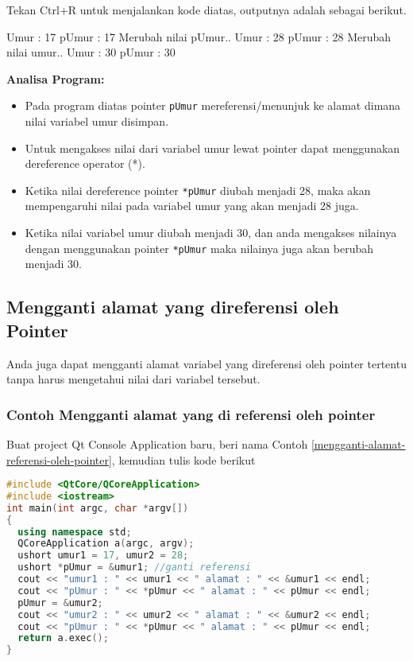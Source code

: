 Tekan Ctrl+R untuk menjalankan kode diatas, outputnya adalah sebagai
berikut.

\begin{lcverbatim}
Umur : 17
pUmur : 17
Merubah nilai pUmur..
Umur : 28
pUmur : 28
Merubah nilai umur..
Umur : 30
pUmur : 30
\end{lcverbatim}

\textbf{Analisa Program:}

\begin{itemize}

\item
  Pada program diatas pointer \texttt{pUmur} mereferensi/menunjuk ke
  alamat dimana nilai variabel umur disimpan.
\item
  Untuk mengakses nilai dari variabel umur lewat pointer dapat
  menggunakan dereference operator (*).
\item
  Ketika nilai dereference pointer \texttt{*pUmur} diubah menjadi 28,
  maka akan mempengaruhi nilai pada variabel umur yang akan menjadi 28
  juga.
\item
  Ketika nilai variabel umur diubah menjadi 30, dan anda mengakses
  nilainya dengan menggunakan pointer \texttt{*pUmur} maka nilainya juga
  akan berubah menjadi 30.
\end{itemize}

\subsection{Mengganti alamat yang direferensi oleh
Pointer}\label{mengganti-alamat-yang-direferensi-oleh-pointer}

Anda juga dapat mengganti alamat variabel yang direferensi oleh pointer
tertentu tanpa harus mengetahui nilai dari variabel tersebut.

\subsubsection*{Contoh  Mengganti alamat yang di referensi oleh pointer}

Buat project Qt Console Application baru, beri nama Contoh \ref{mengganti-alamat-referensi-oleh-pointer}, kemudian
tulis kode berikut

\begin{lstlisting}[language=c++, caption=Mengganti alamat yang di referensi oleh pointer, label=mengganti-alamat-referensi-oleh-pointer]
#include <QtCore/QCoreApplication>
#include <iostream>
int main(int argc, char *argv[])
{
  using namespace std;
  QCoreApplication a(argc, argv);
  ushort umur1 = 17, umur2 = 28;
  ushort *pUmur = &umur1; //ganti referensi
  cout << "umur1 : " << umur1 << " alamat : " << &umur1 << endl;
  cout << "pUmur : " << *pUmur << " alamat : " << pUmur << endl;
  pUmur = &umur2;
  cout << "umur2 : " << umur2 << " alamat : " << &umur2 << endl;
  cout << "pUmur : " << *pUmur << " alamat : " << pUmur << endl;
  return a.exec();
}
\end{lstlisting}


